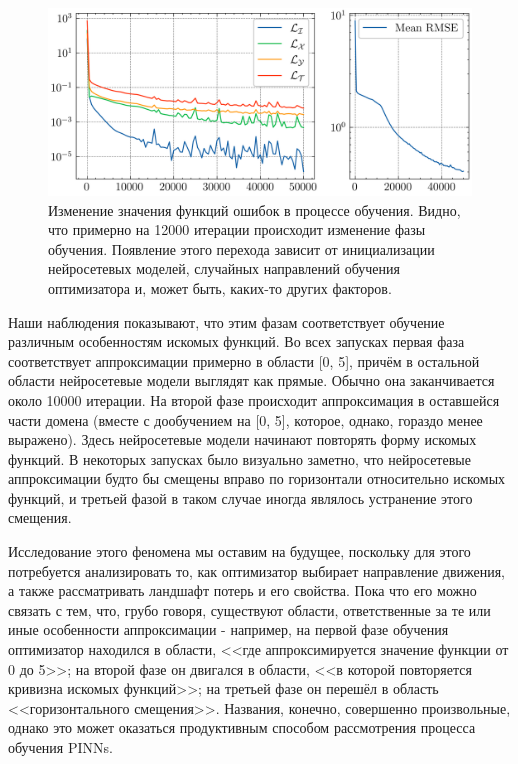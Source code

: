 \documentclass[a4paper, 12pt]{article}
\begin{document}
\begin{figure}
    \centering
    \includegraphics{../images/lotkavolterra/first approach/Losses.png}
    \caption{Изменение значения функций ошибок в процессе обучения. Видно, что примерно на 12000 итерации происходит изменение фазы обучения. Появление этого перехода зависит от инициализации нейросетевых моделей, случайных направлений обучения оптимизатора и, может быть, каких-то других факторов.}
    \label{fig:lotkavolterra:first:losses}
\end{figure}

Наши наблюдения показывают, что этим фазам соответствует обучение различным особенностям искомых функций. Во всех запусках первая фаза соответствует аппроксимации примерно в области [0, 5], причём в остальной области нейросетевые модели выглядят как прямые. Обычно она заканчивается около 10000 итерации. На второй фазе происходит аппроксимация в оставшейся части домена (вместе с дообучением на [0, 5], которое, однако, гораздо менее выражено). Здесь нейросетевые модели начинают повторять форму искомых функций. В некоторых запусках было визуально заметно, что нейросетевые аппроксимации будто бы смещены вправо по горизонтали относительно искомых функций, и третьей фазой в таком случае иногда являлось устранение этого смещения.

Исследование этого феномена мы оставим на будущее, поскольку для этого потребуется анализировать то, как оптимизатор выбирает направление движения, а также рассматривать ландшафт потерь и его свойства. Пока что его можно связать с тем, что, грубо говоря, существуют области, ответственные за те или иные особенности аппроксимации - например, на первой фазе обучения оптимизатор находился в области, <<где аппроксимируется значение функции от 0 до 5>>; на второй фазе он двигался в области, <<в которой повторяется кривизна искомых функций>>; на третьей фазе он перешёл в область <<горизонтального смещения>>. Названия, конечно, совершенно произвольные, однако это может оказаться продуктивным способом рассмотрения процесса обучения PINNs.
\end{document}
